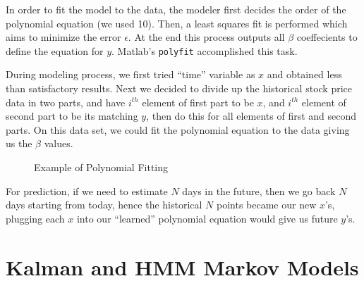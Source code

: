 In order to fit the model to the data, the modeler first decides the order of
the polynomial equation (we used 10). Then, a least squares fit is performed
which aims to minimize the error $\epsilon$. At the end this process outputs all
$\beta$ coeffecients to define the equation for $y$. Matlab's \verb!polyfit!
accomplished this task.

During modeling process, we first tried ``time'' variable as $x$ and obtained
less than satisfactory results. Next we decided to divide up the historical
stock price data in two parts, and have $i^{th}$ element of first part to be
$x$, and $i^{th}$ element of second part to be its matching $y$, then do this
for all elements of first and second parts. On this data set, we could fit the
polynomial equation to the data giving us the $\beta$ values.

\begin{figure}[h]
\caption{Example of Polynomial Fitting}
\vspace{0.6cm}
\end{figure}

For prediction, if we need to estimate $N$ days in the future, then we go back
$N$ days starting from today, hence the historical $N$ points became our new
$x$'s, plugging each $x$ into our ``learned'' polynomial equation would give us
future $y$'s.

\section{Kalman and HMM Markov Models}

